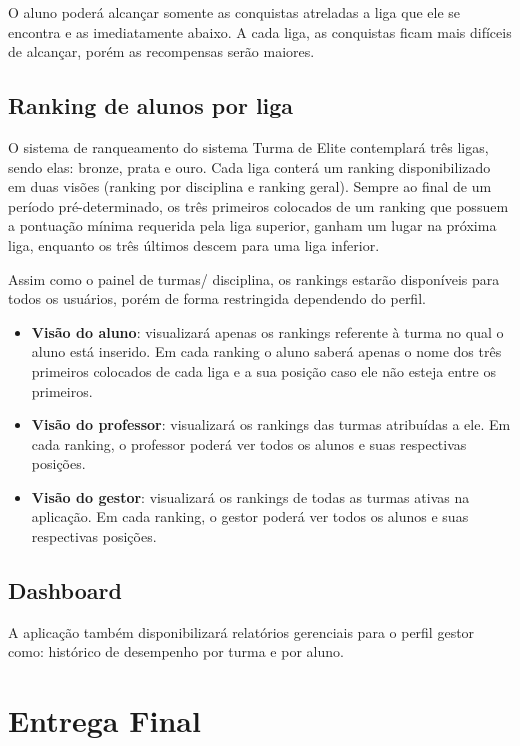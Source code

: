 \documentclass[
    12pt,               %
    openright,          %
    oneside,
    a4paper,            %
    paginasA3,  %
    MODELO,             %
    TODO,               %
    english,            %
    brazil              %
    ]{ifsp-spo-inf-ctds} %
\begin{document}
O aluno poderá alcançar somente as conquistas atreladas a liga que ele se encontra e as imediatamente abaixo. A cada liga, as conquistas ficam mais difíceis de alcançar, porém as recompensas serão maiores. 
\subsection{Ranking de alunos por liga}
O sistema de ranqueamento do sistema Turma de Elite contemplará três ligas, sendo elas: bronze, prata e ouro. Cada liga conterá um ranking disponibilizado em duas visões (ranking por disciplina e ranking geral). Sempre ao final de um período pré-determinado, os três primeiros colocados de um ranking que possuem a pontuação mínima requerida pela liga superior, ganham um lugar na próxima liga, enquanto os três últimos descem para uma liga inferior.

Assim como o painel de turmas/ disciplina, os rankings estarão disponíveis para todos os usuários, porém de forma restringida dependendo do perfil.
\begin{itemize}
\item \textbf{Visão do aluno}: visualizará apenas os rankings referente à turma no qual o aluno está inserido. Em cada ranking o aluno saberá apenas o nome dos três primeiros colocados de cada liga e a sua posição caso ele não esteja entre os primeiros.
\item \textbf{Visão do professor}: visualizará os rankings das turmas atribuídas a ele. Em cada ranking, o professor poderá ver todos os alunos e suas respectivas posições.
\item \textbf{Visão do gestor}: visualizará os rankings de todas as turmas ativas na aplicação. Em cada ranking, o gestor poderá ver todos os alunos e suas respectivas posições.
\end{itemize}

\subsection{Dashboard}
A aplicação também disponibilizará relatórios gerenciais para o perfil gestor como: histórico de desempenho por turma e por aluno.

\section{Entrega Final}
\end{document}

